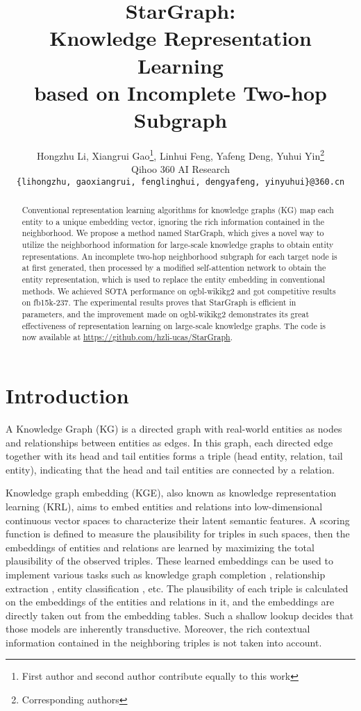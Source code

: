 \documentclass{article}
\title{StarGraph: \\Knowledge Representation Learning \\based on Incomplete Two-hop Subgraph}
\author{
 Hongzhu Li, Xiangrui Gao\thanks{First author and second author contribute equally to this work}, Linhui Feng, Yafeng Deng, Yuhui Yin\thanks{Corresponding authors} \\
 Qihoo 360 AI Research\\
 \texttt{\{lihongzhu, gaoxiangrui, fenglinghui, dengyafeng, yinyuhui\}@360.cn} \\
}
\renewcommand{\thefootnote}{\fnsymbol{footnote}}
\begin{document}
\maketitle
\renewcommand{\thefootnote}{\arabic{footnote}}

\begin{abstract}
Conventional representation learning algorithms for knowledge graphs (KG) map each entity to a unique embedding vector, ignoring the rich information contained in the neighborhood. We propose a method named StarGraph, which gives a novel way to utilize the neighborhood information for large-scale knowledge graphs to obtain entity representations. An incomplete two-hop neighborhood subgraph for each target node is at first generated, then processed by a modified self-attention network to obtain the entity representation, which is used to replace the entity embedding in conventional methods.
We achieved SOTA performance on ogbl-wikikg2 and got competitive results on fb15k-237. The experimental results proves that StarGraph is efficient in parameters, and the improvement made on ogbl-wikikg2 demonstrates its great effectiveness of representation learning on large-scale knowledge graphs.
The code is now available at \url{https://github.com/hzli-ucas/StarGraph}.
\end{abstract}



\section{Introduction}
A Knowledge Graph (KG) is a directed graph with real-world entities as nodes and relationships between entities as edges. In this graph, each directed edge together with its head and tail entities forms a triple (head entity, relation, tail entity), indicating that the head and tail entities are connected by a relation.

Knowledge graph embedding (KGE), also known as knowledge representation learning (KRL), aims to embed entities and relations into low-dimensional continuous vector spaces to characterize their latent semantic features. A scoring function is defined to measure the plausibility for triples in such spaces, then the embeddings of entities and relations are learned by maximizing the total plausibility of the observed triples. These learned embeddings can be used to implement various tasks such as knowledge graph completion \cite{bordes2013translating,wang2014knowledge}, relationship extraction \cite{riedel2013relation}, entity classification \cite{nickel2011three}, etc.
The plausibility of each triple is calculated on the embeddings of the entities and relations in it, and the embeddings are directly taken out from the embedding tables.
Such a shallow lookup decides that those models are inherently transductive.
Moreover, the rich contextual information contained in the neighboring triples is not taken into account.
\end{document}
